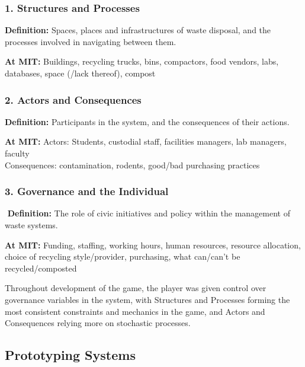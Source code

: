 \documentclass[nofonts,nols,justified,nobib]{tufte-book}
\begin{document}
\subsubsection*{1. Structures and Processes }
\textbf{Definition:} Spaces, places and infrastructures of waste disposal, and the processes involved in navigating between them.

\noindent\textbf{At MIT:} Buildings, recycling trucks, bins, compactors, food vendors, labs, databases, space (/lack thereof), compost
\subsubsection*{2. Actors and Consequences }
\textbf{Definition:} Participants in the system, and the consequences of their actions.

\noindent\textbf{At MIT:}
Actors: Students, custodial staff, facilities managers, lab managers, faculty\\
Consequences: contamination, rodents, good/bad purchasing practices
\subsubsection*{3. Governance and the Individual}
 \textbf{Definition:} The role of civic initiatives and policy within the management of waste systems.

\noindent\textbf{At MIT:} Funding, staffing, working hours, human resources, resource allocation, choice of recycling style/provider, purchasing, what can/can't be recycled/composted

Throughout development of the game, the player was given control over governance variables in the system, with Structures and Processes forming the most consistent constraints and mechanics in the game, and Actors and Consequences relying more on stochastic processes.

\subsection*{Prototyping Systems}
\end{document}
